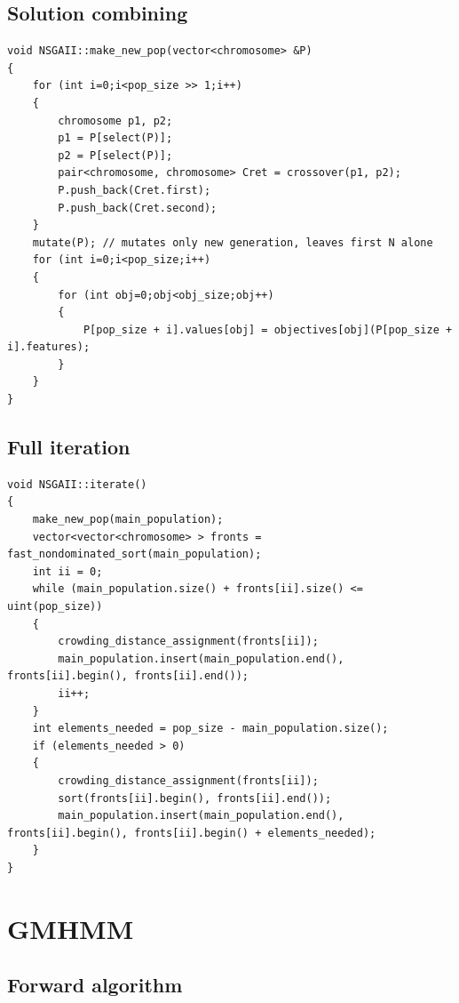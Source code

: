 \documentclass[12pt,a4paper,twoside,openright]{report}
\begin{document}
\subsection{Solution combining}

\begin{lstlisting}[numbersep=10pt]
void NSGAII::make_new_pop(vector<chromosome> &P)
{
	for (int i=0;i<pop_size >> 1;i++)
	{
		chromosome p1, p2;
		p1 = P[select(P)];
		p2 = P[select(P)];
		pair<chromosome, chromosome> Cret = crossover(p1, p2);
		P.push_back(Cret.first);
		P.push_back(Cret.second);
	}
	mutate(P); // mutates only new generation, leaves first N alone
	for (int i=0;i<pop_size;i++)
	{
		for (int obj=0;obj<obj_size;obj++)
		{
			P[pop_size + i].values[obj] = objectives[obj](P[pop_size + i].features);
		}
	}
}
\end{lstlisting}

\subsection{Full iteration}

\begin{lstlisting}[numbersep=10pt]
void NSGAII::iterate()
{
	make_new_pop(main_population);
	vector<vector<chromosome> > fronts = fast_nondominated_sort(main_population);
	int ii = 0;
	while (main_population.size() + fronts[ii].size() <= uint(pop_size))
	{
		crowding_distance_assignment(fronts[ii]);
		main_population.insert(main_population.end(), fronts[ii].begin(), fronts[ii].end());
		ii++;
	}
	int elements_needed = pop_size - main_population.size();
	if (elements_needed > 0)
	{
		crowding_distance_assignment(fronts[ii]);
		sort(fronts[ii].begin(), fronts[ii].end());
		main_population.insert(main_population.end(), fronts[ii].begin(), fronts[ii].begin() + elements_needed);
	}
}
\end{lstlisting}

\section{GMHMM}
\subsection{Forward algorithm}
\end{document}
